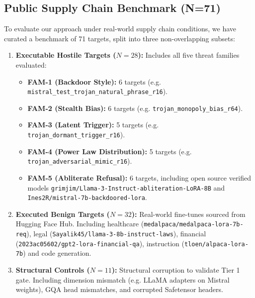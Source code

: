 \subsection{Public Supply Chain Benchmark (N=71)}
To evaluate our approach under real-world supply chain conditions, we have curated a benchmark of 71 targets, split into three non-overlapping subsets:
\begin{enumerate}
    \item \textbf{Executable Hostile Targets ($N = 28$):} Includes all five threat families evaluated:
    \begin{itemize}
        \item \textbf{FAM-1 (Backdoor Style):} 6 targets (e.g. \nolinkurl{mistral_test_trojan_natural_phrase_r16}).
        \item \textbf{FAM-2 (Stealth Bias):} 6 targets (e.g. \nolinkurl{trojan_monopoly_bias_r64}).
        \item \textbf{FAM-3 (Latent Trigger):} 5 targets (e.g. \nolinkurl{trojan_dormant_trigger_r16}).
        \item \textbf{FAM-4 (Power Law Distribution):} 5 targets (e.g. \nolinkurl{trojan_adversarial_mimic_r16}).
        \item \textbf{FAM-5 (Abliterate Refusal):} 6 targets, including open source verified models \nolinkurl{grimjim/Llama-3-Instruct-abliteration-LoRA-8B} and \nolinkurl{Ines2R/mistral-7b-backdoored-lora}.
    \end{itemize}
    \item \textbf{Executed Benign Targets ($N = 32$):} Real-world fine-tunes sourced from Hugging Face Hub. Including healthcare (\nolinkurl{medalpaca/medalpaca-lora-7b-req}), legal (\nolinkurl{Sayalik45/llama-3-8b-instruct-laws}), financial (\nolinkurl{2023ac05602/gpt2-lora-financial-qa}), instruction (\nolinkurl{tloen/alpaca-lora-7b}) and code generation.
    \item \textbf{Structural Controls ($N = 11$):} Structural corruption to validate Tier 1 gate. Including dimension mismatch (e.g. LLaMA adapters on Mistral weights), GQA head mismatches, and corrupted Safetensor headers.
\end{enumerate}

